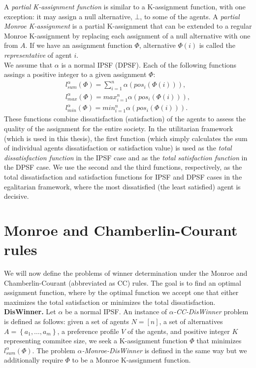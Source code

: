 A \textit{partial K-assignment function} is similar to a K-assignment function, with one exception: it may assign a null alternative, $\bot$, to some of the agents. A \textit{partial Monroe K-assignment} is a partial K-assignment that can be extended to a regular Monroe K-assignment by replacing each assignment of a null alternative with one from $A$. If we have an assignment function $\Phi$, alternative $\Phi(i)$ is called the \textit{representative} of agent $i$.
\\

We assume that $\alpha$ is a normal IPSF (DPSF). Each of the following functions assings a positive integer to a given assignment $\Phi$:
\begin{gather}
	l^{\alpha}_{sum}(\Phi) = \sum^{n}_{i=1} \alpha (pos_{i}(\Phi(i))),\\
	l^{\alpha}_{max}(\Phi) = max^{n}_{i=1} \alpha (pos_{i}(\Phi(i))),\\
	l^{\alpha}_{min}(\Phi) = min^{n}_{i=1} \alpha (pos_{i}(\Phi(i))).
\end{gather}
These functions combine dissatisfaction (satisfaction) of the agents to assess the quality of the assignment for the entire society. In the utilitarian framework (which is used in this thesis), the first function (which simply calculates the sum of individual agents dissatisfaction or satisfaction value) is used as the \textit{total dissatisfaction function} in the IPSF case and as the \textit{total satisfaction function} in the DPSF case. We use the second and the third functions, respectively, as the total dissatisfaction and satisfaction functions for IPSF and DPSF cases in the egalitarian framework, where the most dissatisfied (the least satisfied) agent is decisive.

\section{Monroe and Chamberlin-Courant rules}

We will now define the problems of winner determination under the Monroe and Chamberlin-Courant (abbreviated as CC) rules. The goal is to find an optimal assignment function, where by the optimal function we accept one that either maximizes the total satisfaction or minimizes the total dissatisfaction.
\\

\noindent
\textbf{DisWinner.} Let $\alpha$ be a normal IPSF. An instance of $\alpha$\textit{-CC-DisWinner} problem is defined as follows: given a set of agents $N = [n]$, a set of alternatives $A = \left\{ a_{1}, \ldots, a_{m} \right\}$, a preference profile $V$ of the agents, and positive integer $K$ representing commitee size, we seek a K-assignment function $\Phi$ that minimizes $l^{\alpha}_{sum}(\Phi)$. The problem $\alpha$\textit{-Monroe-DisWinner} is defined in the same way but we additionally require $\Phi$ to be a Monroe K-assignment function.
\\

